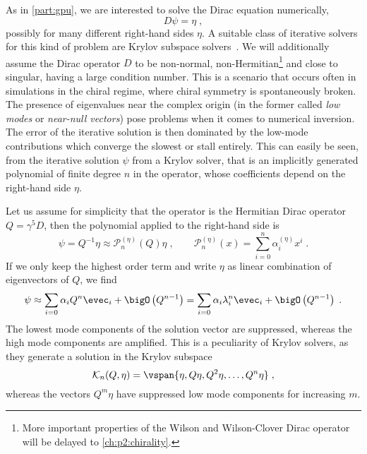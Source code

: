 As in \cref{part:gpu}, we are interested to solve the Dirac equation numerically,
\begin{equation} \label{eq:var:dirac:equation}
D \psi = \eta \;,
\end{equation}
possibly for many different right-hand sides $\eta$.
A suitable class of iterative solvers for this kind of problem are Krylov subspace solvers~\cite{krylov1931numerical,book:saad2003iterative}.
We will additionally assume the Dirac operator $D$ to be non-normal, non-Hermitian\footnote{More important properties of the Wilson and Wilson-Clover Dirac operator will be delayed to \cref{ch:p2:chirality}.} and close to singular, \ie having a large condition number.
This is a scenario that occurs often in simulations in the chiral regime, where chiral symmetry is spontaneously broken.
The presence of eigenvalues near the complex origin (in the former called \emph{low modes} or \emph{near-null vectors}) pose problems when it comes to numerical inversion.
The error of the iterative solution is then dominated by the low-mode contributions which converge the slowest or stall entirely.
This can easily be seen, from the iterative solution $\psi$ from a Krylov solver, that is an implicitly generated polynomial of finite degree $n$ in the operator, whose coefficients depend on the right-hand side $\eta$.

Let us assume for simplicity that the operator is the Hermitian Dirac operator $Q = \gamma^{5}D$, then the polynomial applied to the right-hand side is
\begin{equation}
\psi = Q^{-1} \eta \approx \mathcal{P}_{n}^{(\eta)}(Q) \eta \;,
\qquad
\mathcal{P}_{n}^{(\eta)}(x) = \sum_{i=0}^{n} \alpha_{i}^{(\eta)} x^i \;.
\end{equation}
If we only keep the highest order term and write $\eta$ as linear combination of eigenvectors of $Q$, we find
\begin{eqnarray}
\psi
\approx \sum_{i=0} \alpha_i Q^{n} \evec_i + \bigO\left(Q^{n-1}\right)
= \sum_{i=0} \alpha_i \lambda_i^{n} \evec_i + \bigO\left(Q^{n-1}\right) \;.
\end{eqnarray}
The lowest mode components of the solution vector are suppressed, whereas the high mode components are amplified.
This is a peculiarity of Krylov solvers, as they generate a solution in the Krylov subspace~\cite{wright2006numerical,simoncini2003theory}
\begin{equation}
\mathcal{K}_n(Q, \eta) = \vspan{ \eta, Q \eta, Q^{2} \eta, \ldots, Q^{n} \eta } \;,
\end{equation}
whereas the vectors $Q^{m} \eta$ have suppressed low mode components for increasing $m$.

